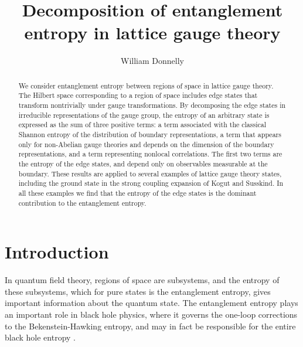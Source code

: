 \documentclass[aps,prd,twocolumn,showpacs,groupedaddress,nofootinbib,letterpaper]{revtex4}
\begin{document}
\title{Decomposition of entanglement entropy in lattice gauge theory}
\author{William Donnelly}

\begin{abstract}
We consider entanglement entropy between regions of space in lattice gauge theory.
The Hilbert space corresponding to a region of space includes edge states that transform nontrivially under gauge transformations.
By decomposing the edge states in irreducible representations of the gauge group, the entropy of an arbitrary state is expressed as the sum of three positive terms: a term associated with the classical Shannon entropy of the distribution of boundary representations,
a term that appears only for non-Abelian gauge theories and depends on the dimension of the boundary representations, 
and a term representing nonlocal correlations.
The first two terms are the entropy of the edge states, and depend only on observables measurable at the boundary.
These results are applied to several examples of lattice gauge theory states, including the ground state in the strong coupling expansion of Kogut and Susskind.
In all these examples we find that the entropy of the edge states is the dominant contribution to the entanglement entropy.
\end{abstract}



\maketitle

\section{Introduction}

In quantum field theory, regions of space are subsystems, and the entropy of these subsystems, which for pure states is the entanglement entropy, gives important information about the quantum state.
The entanglement entropy plays an important role in black hole physics, where it governs the one-loop corrections to the Bekenstein-Hawking entropy, and may in fact be responsible for the entire black hole entropy \cite{Bombelli1986,Srednicki1993,Susskind1994,Jacobson1994}.
\end{document}

